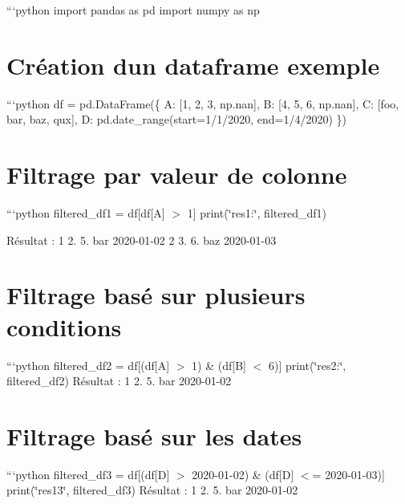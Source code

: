 ```python import pandas as pd import numpy as np

\section*{Création d\textquotesingle{}un dataframe exemple}

```python df = pd.\+Data\+Frame(\{ \textquotesingle{}A\textquotesingle{}\+: \mbox{[}1, 2, 3, np.\+nan\mbox{]}, \textquotesingle{}B\textquotesingle{}\+: \mbox{[}4, 5, 6, np.\+nan\mbox{]}, \textquotesingle{}C\textquotesingle{}\+: \mbox{[}\textquotesingle{}foo\textquotesingle{}, \textquotesingle{}bar\textquotesingle{}, \textquotesingle{}baz\textquotesingle{}, \textquotesingle{}qux\textquotesingle{}\mbox{]}, \textquotesingle{}D\textquotesingle{}\+: pd.\+date\+\_\+range(start=\textquotesingle{}1/1/2020\textquotesingle{}, end=\textquotesingle{}1/4/2020\textquotesingle{}) \})

\section*{Filtrage par valeur de colonne}

```python filtered\+\_\+df1 = df\mbox{[}df\mbox{[}\textquotesingle{}A\textquotesingle{}\mbox{]} $>$ 1\mbox{]} print(\char`\"{}res1\+:\char`\"{}, filtered\+\_\+df1)

Résultat \+: 1 2. 5. bar 2020-\/01-\/02 2 3. 6. baz 2020-\/01-\/03

\section*{Filtrage basé sur plusieurs conditions}

```python filtered\+\_\+df2 = df\mbox{[}(df\mbox{[}\textquotesingle{}A\textquotesingle{}\mbox{]} $>$ 1) \& (df\mbox{[}\textquotesingle{}B\textquotesingle{}\mbox{]} $<$ 6)\mbox{]} print(\char`\"{}res2\+:\char`\"{}, filtered\+\_\+df2) Résultat \+: 1 2. 5. bar 2020-\/01-\/02

\section*{Filtrage basé sur les dates}

```python filtered\+\_\+df3 = df\mbox{[}(df\mbox{[}\textquotesingle{}D\textquotesingle{}\mbox{]} $>$ \textquotesingle{}2020-\/01-\/02\textquotesingle{}) \& (df\mbox{[}\textquotesingle{}D\textquotesingle{}\mbox{]} $<$= \textquotesingle{}2020-\/01-\/03\textquotesingle{})\mbox{]} print(\char`\"{}res13\char`\"{}, filtered\+\_\+df3) Résultat \+: 1 2. 5. bar 2020-\/01-\/02


